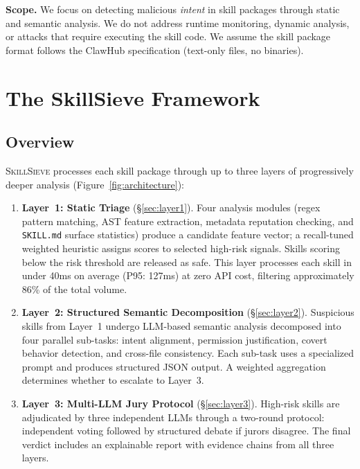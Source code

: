 \documentclass[sigconf,nonacm]{acmart}
\begin{document}
\textbf{Scope.} We focus on detecting malicious \emph{intent} in skill packages through static and semantic analysis. We do not address runtime monitoring, dynamic analysis, or attacks that require executing the skill code. We assume the skill package format follows the ClawHub specification (text-only files, no binaries).

\section{The SkillSieve Framework}
\label{sec:framework}

\subsection{Overview}

\textsc{SkillSieve} processes each skill package through up to three layers of progressively deeper analysis (Figure~\ref{fig:architecture}):

\begin{enumerate}
    \item \textbf{Layer~1: Static Triage} (\S\ref{sec:layer1}). Four analysis modules (regex pattern matching, AST feature extraction, metadata reputation checking, and \texttt{SKILL.md} surface statistics) produce a candidate feature vector; a recall-tuned weighted heuristic assigns scores to selected high-risk signals. Skills scoring below the risk threshold are released as safe. This layer processes each skill in under 40ms on average (P95: 127ms) at zero API cost, filtering approximately 86\% of the total volume.

    \item \textbf{Layer~2: Structured Semantic Decomposition} (\S\ref{sec:layer2}). Suspicious skills from Layer~1 undergo LLM-based semantic analysis decomposed into four parallel sub-tasks: intent alignment, permission justification, covert behavior detection, and cross-file consistency. Each sub-task uses a specialized prompt and produces structured JSON output. A weighted aggregation determines whether to escalate to Layer~3.

    \item \textbf{Layer~3: Multi-LLM Jury Protocol} (\S\ref{sec:layer3}). High-risk skills are adjudicated by three independent LLMs through a two-round protocol: independent voting followed by structured debate if jurors disagree. The final verdict includes an explainable report with evidence chains from all three layers.
\end{enumerate}
\end{document}
